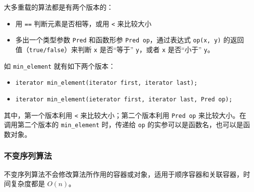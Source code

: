 \documentclass[UTF8]{ctexart}
\begin{document}
大多重载的算法都是有两个版本的：
\begin{itemize}
    \item 用 \texttt{==} 判断元素是否相等，或用 \texttt{<} 来比较大小
    \item 多出一个类型参数 \texttt{Pred} 和函数形参 \texttt{Pred op}，通过表达式 \texttt{op(x, y)} 的返回
    值（\texttt{true/false}）来判断 \texttt{x} 是否“等于” \texttt{y}，或者 \texttt{x} 是否“小于”
    \texttt{y}。
\end{itemize}

如 \texttt{min\_element} 就有如下两个版本：
\begin{itemize}
    \item \texttt{iterator min_element(iterator first, iterator last);}
    \item \texttt{iterator min_element(ieterator first, iterator last, Pred op);}
\end{itemize}
其中，第一个版本利用 \texttt{<} 来比较大小；第二个版本利用 \texttt{Pred op} 来比较大小。在调用第二个版本的
\texttt{min\_element} 时，传递给 \texttt{op} 的实参可以是函数名，也可以是函数对象。

\subsubsection{不变序列算法}
不变序列算法不会修改算法所作用的容器或对象，适用于顺序容器和关联容器，时间复杂度都是 $O(n)$。
\end{document}
